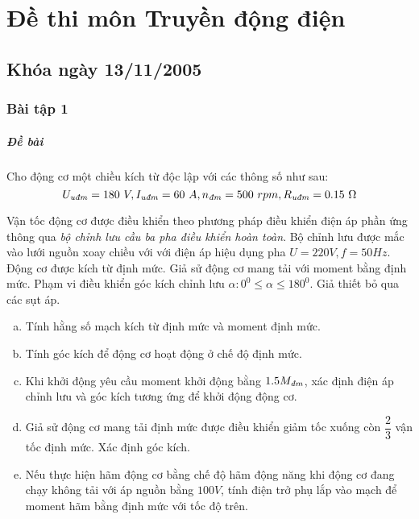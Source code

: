 \documentclass[12pt,a4paper]{article}
\begin{document}
\section{Đề thi môn Truyền động điện}
\subsection{Khóa ngày 13/11/2005}
\subsubsection{Bài tập 1}
\subparagraph{Đề bài} Cho động cơ một chiều kích từ độc lập với các thông số như sau: $$\vqitalic{U} = 180 \unit{V}, \vqitalic{I} = 60 \unit{A}, \vitalic{n} = 500 \unit{rpm}, \vqitalic{R} = 0.15 \unit{\Omega}$$

Vận tốc động cơ được điều khiển theo phương pháp điều khiển điện áp phần ứng thông qua \textit{bộ chỉnh lưu cầu ba pha điều khiển hoàn toàn}. Bộ chỉnh lưu được mắc vào lưới nguồn xoay chiều với với điện áp hiệu dụng pha $U = 220 \unit{V}, f = 50 \unit{Hz}$. Động cơ được kích từ định mức. Giả sử động cơ mang tải với moment bằng định mức. Phạm vi điều khiển góc kích chỉnh lưu $\alpha: 0^0 \leq \alpha \leq  180^0$. Giả thiết bỏ qua các sụt áp.
\begin{enumerate}[a.]
\item Tính hằng số mạch kích từ định mức và moment định mức.
\item Tính góc kích để động cơ hoạt động ở chế độ định mức.
\item Khi khởi động yêu cầu moment khởi động bằng $1.5 \vitalic{M}$, xác định điện áp chỉnh lưu và góc kích tương ứng để khởi động động cơ.
\item Giả sử động cơ mang tải định mức được điều khiển giảm tốc xuống còn $\dfrac{2}{3}$ vận tốc định mức. Xác định góc kích.
\item Nếu thực hiện hãm động cơ bằng chế độ hãm động năng khi động cơ đang chạy không tải với áp nguồn bằng $100 \unit{V}$, tính điện trở phụ lắp vào mạch để moment hãm bằng định mức với tốc độ trên.
\end{enumerate}
\end{document}
